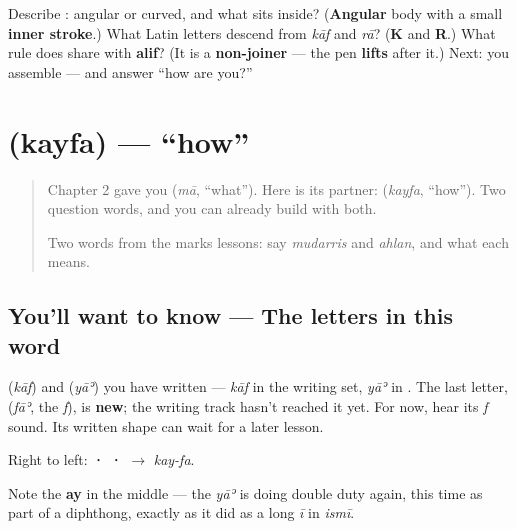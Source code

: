 \begin{tcolorbox}[breakable,colback=teal!4,colframe=teal!35!black,title={Before you move on}]
Describe \textbf{}: angular or curved, and what sits inside? (\textbf{Angular} body with a small \textbf{inner stroke}.) What Latin letters descend from \emph{kāf} and \emph{rā}? (\textbf{K} and \textbf{R}.) What rule does \textbf{} share with \textbf{alif}? (It is a \textbf{non-joiner} — the pen \textbf{lifts} after it.) Next: you assemble \textbf{} — and answer \textquotedblleft{}how are you?\textquotedblright{}
\end{tcolorbox}
\section[\texorpdfstring{\ar{كيف} (kayfa)}{كيف (kayfa)}]{ (kayfa) — \textquotedblleft{}how\textquotedblright{}}

\label{lesson:AR-C03-kayfa}



\begin{quote}
Chapter 2 gave you \textbf{} (\emph{mā}, \textquotedblleft{}what\textquotedblright{}). Here is its partner: \textbf{} (\emph{kayfa}, \textquotedblleft{}how\textquotedblright{}). Two question words, and you can already build with both.

Two words from the marks lessons: say \emph{mudarris} and \emph{ahlan}, and what each means.
\end{quote}

\subsection*{You'll want to know — The letters in this word}
\textbf{} (\emph{kāf}) and \textbf{} (\emph{yāʾ}) you have written — \emph{kāf} in the writing set, \emph{yāʾ} in \textbf{}. The last letter, \textbf{} (\emph{fāʾ}, the \emph{f}), is \textbf{new}; the writing track hasn't reached it yet. For now, hear its \emph{f} sound. Its written shape can wait for a later lesson.

Right to left: \textbf{ ·  · } $\to$ \emph{kay-fa}.

Note the \textbf{ay} in the middle — the \emph{yāʾ} is doing double duty again, this time as part of a diphthong, exactly as it did as a long \emph{ī} in \emph{ismī}.

